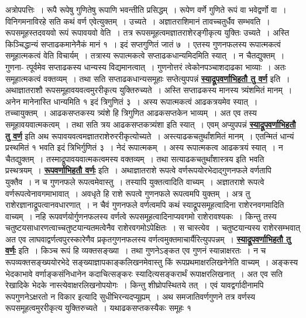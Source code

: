 \documentclass[11pt, openany]{book}
\begin{document}
अत्रोपपत्तिः~। रूपै रूपेषु गुणितेषु रूपाणि भवन्तीति प्रसिद्धम्~। रूपेण वर्णे
गुणिते रूपं वा भवेद्वर्णो वा~। विनिगमनाविरहे सति कथं वर्ण एवेत्युक्तम्~। उच्यते~।
अज्ञातराशिमानं तावच्चतुर्धैव सम्भवति~। रूपसमूहस्तदवयवो रूपं रूपावयवो वेति~। तत्र रूपसमूहत्वमज्ञातराशेरङ्गीकृत्य युक्तिः उच्यते~। अस्ति किञ्चिद्धान्यं सप्ताढकमानेनैकं मानं १~।
इदं सप्तगुणितं जातं ७~। एतस्य गुणनफलस्य रूपात्मकत्वं समूहात्मकत्वं
वेति विचार्यम्~। तत्रास्य रूपात्मकत्वे सप्ताढकधान्यमिदमिति स्यात्~। न
चैतद्युक्तम्~। गुणना-
\newpage
\noindent त्पूर्वमेव सप्ताढकस्य धान्यस्य विद्यमानत्वात्~। गुणनोत्तरं
त्वेकोनपञ्चाशदाढका भाव्याः~। अतः समूहात्मकत्वं वक्तव्यम्~। तथा सति सप्ताढकधान्यसमूहाः
सप्तेत्युपपन्नं \hyperref[26]{\textbf{स्याद्रूपवर्णाभिहतौ तु वर्ण}} इति~। अथाज्ञातराशौ
रूपसमूहावयवत्वमुररीकृत्य युक्तिरुच्यते~। अस्ति सप्ताढकस्य मानस्य त्र्यंशमितं मानम्~। अनेन
मानेनास्ति धान्यमिति १ इदं त्रिगुणितं ३~। अस्य रूपात्मकत्वं आढकत्रयमेव स्यात्~।
तच्चायुक्तम्~। आढकसप्तकस्य त्र्यंशे हि त्रिगुणित आढकसप्तकेन भाव्यम्~। अत एव तस्य समूहावयवात्मकत्वम्~। तथा सति त्रय आढकसप्तकत्र्यंशा इति स्यात्~। एवम् अप्युपपन्नं \hyperref[26]{\textbf{स्याद्रूपवर्णाभिहतौ तु वर्ण}} इति अथ रूपावयवत्वमज्ञातराशेरुररीकृत्योच्यते~।
अस्त्याढकचतुर्थांशमितं मानम्~। एतन्मितं धान्यं प्रस्थमितं १ भवति इदं
त्रिभिर्गुणितं ३~। नेदं रूपात्मकम्~। अस्य रूपात्मकत्व आढकत्रयं स्यात्~। न चैतद्युक्तम्~। तस्माद्रूपावयवात्मकत्वमस्य वक्तव्यम्~। तथा सत्याढकचतुर्थांशास्त्रय इति भवति प्रस्थत्रयम्~। \hyperref[26]{\textbf{रूपवर्णाभिहतौ वर्णः}} इति~। अथाज्ञातराशे रूपत्वे
वर्णरूपयोरभेदाद्गुणनफले वर्णतापि युक्तैव~। न च गुणनफले रूपत्वमेवास्तु~। तस्यापि युक्तत्वादिति
वाच्यम्~। अज्ञातराशे रूपत्वे वर्णरूपत्वेनावगमाभावात्~। अवधृते हि राशे रूपत्वे
गुणनफले रूपत्वमपि युक्तम्~। अत्र तु राशेरज्ञानाद्रूपत्वानवधारणात्~। न चैवं
गुणनफले वर्णत्वमपि कथं स्याद्रूपसमूहत्वादिना राशेरनवगमादिति वाच्यम्~। नहि
रूपवर्णयोर्गुणनफलस्य वर्णत्वे रूपसमूहत्वादिनाप्यवगमो राशेरावश्यकः~। किन्तु तस्य
चतुष्टयसाधारणत्वाच्चतुष्टयान्यतमत्वेनैव राशेरवगमोऽपेक्षितः~। स चास्त्येव~। चतुष्टयान्यस्य
राशेरसम्भवात् अत एव लाघवाद्वर्णत्वपुरस्कारेणैव प्रकृतगुणनफलस्य
वर्णत्वमुक्तमाचार्यैरित्युपपन्नम्~।
\hyperref[26]{\textbf{स्याद्रूपवर्णाभिहतौ तु वर्णः}} इति~। किञ्च रूपं हि व्यक्तसङ्ख्या~। तथा
गुणनेऽङ्कत एव गुणनं स्यान्नाक्षरतः~। न च रूपव्यक्तसङ्ख्ययोरभेदे
सङ्ख्याज्ञापकाङ्कलिखनमेवास्तु किं रूपप्रथमाक्षरलिखनेनेति वाच्यम्~। अङ्कस्य भेदकाभावे वर्णाङ्कसंनिधानेन
कदाचित्सङ्करः स्यादित्यसङ्करार्थं रूपाक्षरलिखनात्~। अत एव सति रेखादिके भेदके
नास्त्येवाक्षरलिखनोपयोगः~। किन्तु शीघ्रोपस्थितये तत्~। एवं यावद्वर्गादीनामपि
रूपगुणनेऽक्षरतो न विकार इत्यादि सुधीभिरन्यदप्यूह्यम्~। अथ समजातिवर्णगुणने तत्र वर्णस्य रूपसमूहत्वमुररीकृत्य युक्तिरुच्यते~। यथाढकसप्तकस्यैकः समूहः १
\end{document}
